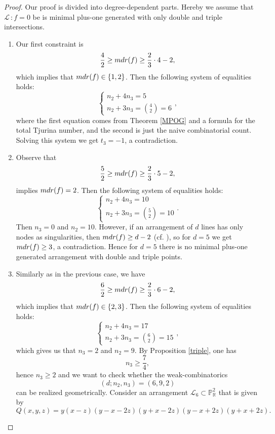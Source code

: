 \documentclass[12pt]{article}
\theoremstyle{plain}
\theoremstyle{definition}
\begin{document}
\begin{proof} Our proof is divided into degree-dependent parts. Hereby we assume that $\mathcal{L} \, : f=0$ be is minimal plus-one generated with only double and triple intersections.
\begin{enumerate}
    \item[$d=4$:] Our first constraint is
    $$\frac{4}{2} \geq {\rm mdr}(f) \geq \frac{2}{3}\cdot 4-2,$$
    which implies that ${\rm mdr}(f) \in \{1,2\}$. Then the following system of equalities holds:\[
    \begin{cases}
      n_{2} + 4n_{3} =5  \\
      n_{2} + 3n_{3} = \binom{4}{2}=6
    \end{cases},\]
    where the first equation comes from Theorem \ref{MPOG} and a formula for the total Tjurina number, and the second is just the naive combinatorial count. Solving this system we get $t_{3}=-1$, a contradiction.
    \item[$d=5$:]  Observe that
    $$\frac{5}{2} \geq {\rm mdr}(f) \geq \frac{2}{3}\cdot 5-2,$$
    implies ${\rm mdr}(f) = 2$. Then the following system of equalities holds:\[
    \begin{cases}
      n_{2} + 4n_{3} = 10  \\
      n_{2} + 3n_{3} = \binom{5}{2}=10
    \end{cases}.\]
    Then $n_{3}=0$ and $n_{2}=10$. However, if an arrangement of $d$ lines has only nodes as singularities, then ${\rm mdr}(f) \geq d - 2$ (cf. \cite[Proposition 3.2]{MP}), so for $d=5$ we get ${\rm mdr}(f) \geq 3$, a contradiction. Hence for $d=5$ there is no minimal plus-one generated arrangement with double and triple points.
    \item[$d=6$:]  Similarly as in the previous case, we have
    $$\frac{6}{2} \geq {\rm mdr}(f) \geq \frac{2}{3}\cdot 6-2,$$
    which implies that ${\rm mdr}(f) \in \{2,3\}$. Then the following system of equalities holds:\[
    \begin{cases}
      n_{2} + 4n_{3} = 17  \\
      n_{2} + 3n_{3} = \binom{6}{2}=15
    \end{cases},\]
    which gives us that $n_{3}=2$ and $n_{2}=9$.
    By Proposition \ref{triple}, one has
    $$n_{3} \geq \frac{7}{4},$$
    hence $n_{3} \geq 2$ and we want to check whether the weak-combinatorics 
    $$(d;n_{2},n_{3}) = (6,9,2)$$
    can be realized geometrically. Consider an arrangement $\mathcal{L}_{6} \subset \mathbb{P}^{2}_{\mathbb{R}}$ that is given by
    $$Q(x,y,z) = y(x-z)(y-x-2z)(y+x-2z)(y-x+2z)(y+x+2z).$$

\end{enumerate}
\end{proof}
\end{document}
